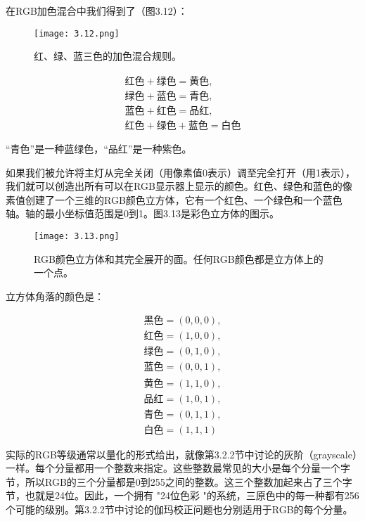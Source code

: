 \documentclass[lang=cn,12pt]{elegantbook}
\begin{document}

在RGB加色混合中我们得到了（图3.12）：

\begin{figure}[htb]
  \centering
  \texttt{[image: 3.12.png]}
  \caption{红、绿、蓝三色的加色混合规则。}
\end{figure}

\[
  \begin{aligned}
  \mbox{红色} + \mbox{绿色} = \mbox{黄色},\\
  \mbox{绿色} + \mbox{蓝色} = \mbox{青色},\\
  \mbox{蓝色} + \mbox{红色} = \mbox{品红},\\
  \mbox{红色} + \mbox{绿色} + \mbox{蓝色} = \mbox{白色}
  \end{aligned}
\]

“青色”是一种蓝绿色，“品红”是一种紫色。

如果我们被允许将主灯从完全关闭（用像素值0表示）调至完全打开（用1表示），我们就可以创造出所有可以在RGB显示器上显示的颜色。红色、绿色和蓝色的像素值创建了一个三维的RGB颜色立方体，它有一个红色、一个绿色和一个蓝色轴。轴的最小坐标值范围是0到1。图3.13是彩色立方体的图示。

\begin{figure}[htb]
  \centering
  \texttt{[image: 3.13.png]}
  \caption{RGB颜色立方体和其完全展开的面。任何RGB颜色都是立方体上的一个点。}
\end{figure}

立方体角落的颜色是：

\[
  \begin{aligned}
  \mbox{黑色} = (0,0,0),\\
  \mbox{红色} = (1,0,0),\\
  \mbox{绿色} = (0,1,0),\\
  \mbox{蓝色} = (0,0,1),\\
  \mbox{黄色} = (1,1,0),\\
  \mbox{品红} = (1,0,1),\\
  \mbox{青色} = (0,1,1),\\
  \mbox{白色} = (1,1,1)
  \end{aligned}
\]

实际的RGB等级通常以量化的形式给出，就像第3.2.2节中讨论的灰阶（grayscale）一样。每个分量都用一个整数来指定。这些整数最常见的大小是每个分量一个字节，所以RGB的三个分量都是0到255之间的整数。这三个整数加起来占了三个字节，也就是24位。因此，一个拥有 "24位色彩 "的系统，三原色中的每一种都有256个可能的级别。第3.2.2节中讨论的伽玛校正问题也分别适用于RGB的每个分量。
\end{document}

